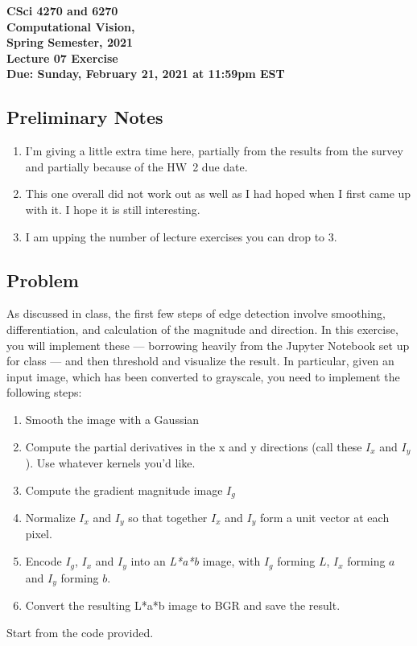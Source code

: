 \documentclass[11pt]{article}
\begin{document}
\begin{center}
\large
\textbf{CSci 4270 and 6270 \\
Computational Vision,\\
Spring Semester, 2021} \\
\textbf{Lecture 07 Exercise} \\
\textbf{Due: Sunday, February 21, 2021 at 11:59pm EST}
\end{center}


\subsection*{Preliminary Notes}
\begin{enumerate}
\item  I'm giving a little extra time here, partially from the results from
the survey and partially because of the HW~2 due date.
\item This one overall did not work out as well as I had hoped when I
  first came up with it. I hope it is still interesting.
\item I am upping the number of lecture exercises you can drop to 3.
\end{enumerate}

\subsection*{Problem}

As discussed in class, the first few steps of edge detection involve
smoothing, differentiation, and calculation of the magnitude and
direction. In this exercise, you will implement these --- borrowing
heavily from the Jupyter Notebook set up for class --- and then
threshold and visualize the result. In particular, given an input
image, which has been converted to grayscale, you need to implement
the following steps:
\begin{enumerate}
\item Smooth the image with a Gaussian
\item Compute the partial derivatives in the x and y directions (call
these $I_x$ and $I_y$).  Use whatever kernels you'd like.
\item Compute the gradient magnitude image $I_g$
\item Normalize $I_x$ and $I_y$ so that together $I_x$ and $I_y$ form
a unit vector at each pixel.
\item Encode $I_g$, $I_x$ and $I_y$ into an \emph{L*a*b} image, with $I_g$
forming $L$, $I_x$ forming $a$ and $I_y$ forming $b$.
\item Convert the resulting L*a*b image to BGR and save the result.
\end{enumerate}
Start from the code provided.
\end{document}
